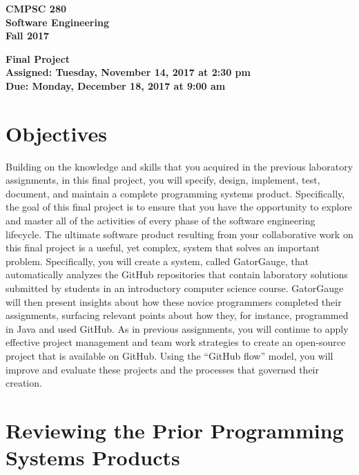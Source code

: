 \documentclass[11pt]{article}
\newcommand{\assignmentduedate}{December 18}
\newcommand{\assignmentassignedate}{November 14}
\newcommand{\labyear}{2017}
\newcommand{\labday}{Tuesday}
\newcommand{\labdueday}{Monday}
\newcommand{\labtime}{2:30 pm}
\newcommand{\labduetime}{9:00 am}
\newcommand{\assigneddate}{Assigned: \labday, \assignmentassignedate, \labyear{} at \labtime{}}
\newcommand{\duedate}{Due: \labdueday, \assignmentduedate, \labyear{} at \labduetime{}}
\newcommand{\labtitle}[1]
{
  \begin{center}
    \begin{center}
      \bf
      CMPSC 280\\Software Engineering\\
      Fall 2017\\
      \medskip
    \end{center}
    \bf
    #1
  \end{center}
}
\begin{document}
\thispagestyle{empty}

\labtitle{Final Project \\ \assigneddate{} \\ \duedate{}}

\section*{Objectives}


Building on the knowledge and skills that you acquired in the previous laboratory assignments, in this final project,
you will specify, design, implement, test, document, and maintain a complete programming systems product. Specifically,
the goal of this final project is to ensure that you have the opportunity to explore and master all of the activities of
every phase of the software engineering lifecycle. The ultimate software product resulting from your collaborative work
on this final project is a useful, yet complex, system that solves an important problem. Specifically, you will create a
system, called GatorGauge, that automatically analyzes the GitHub repositories that contain laboratory solutions
submitted by students in an introductory computer science course. GatorGauge will then present insights about how these
novice programmers completed their assignments, surfacing relevant points about how they, for instance, programmed in
Java and used GitHub. As in previous assignments, you will continue to apply effective project management and team work
strategies to create an open-source project that is available on GitHub. Using the ``GitHub flow'' model, you will
improve and evaluate these projects and the processes that governed their creation.

\section*{Reviewing the Prior Programming Systems Products}
\end{document}
